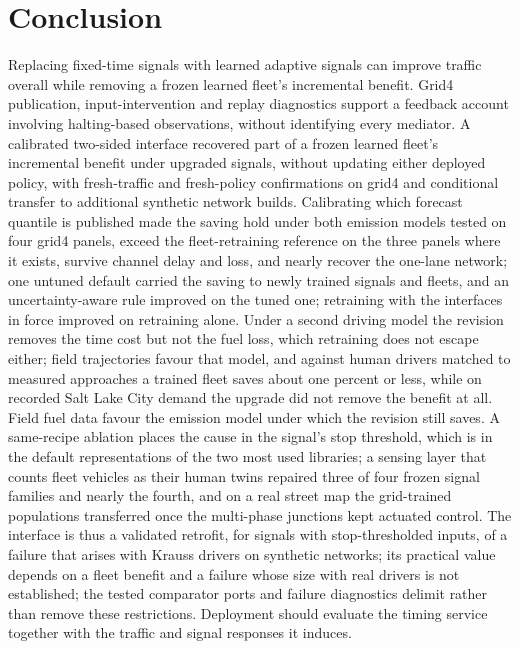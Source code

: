 \section{Conclusion}\label{sec:conclusion}
Replacing fixed-time signals with learned adaptive signals can improve traffic overall while removing a frozen learned fleet's incremental
benefit. Grid4 publication, input-intervention and replay diagnostics support a feedback account involving halting-based observations,
without identifying every mediator. A calibrated two-sided interface recovered part of a frozen learned fleet's incremental benefit under
upgraded signals, without updating either deployed policy, with fresh-traffic and fresh-policy confirmations on grid4 and conditional
transfer to additional synthetic network builds. Calibrating which forecast quantile is published made the saving hold under both
emission models tested on four grid4 panels, exceed the fleet-retraining reference on the three panels where it exists, survive channel
delay and loss, and nearly recover the one-lane network; one untuned default carried the saving to newly trained signals and fleets, and
an uncertainty-aware rule improved on the tuned one; retraining with the interfaces in force improved on retraining alone. Under a second
driving model the revision removes the time cost but not the fuel loss, which retraining does not escape either; field trajectories favour
that model, and against human drivers matched to measured approaches a trained fleet saves about one percent or less, while on recorded Salt
Lake City demand the upgrade did not remove the benefit at all. Field fuel data favour the emission model under which the revision still
saves. A same-recipe ablation places the cause in the signal's stop threshold, which is in the default representations of the two most used
libraries; a sensing layer that counts fleet vehicles as their human twins repaired three of four frozen signal families and nearly the
fourth, and on a real street map the grid-trained populations transferred once the multi-phase junctions kept actuated control. The
interface is thus a validated retrofit, for signals with stop-thresholded inputs, of a failure that arises with Krauss drivers on synthetic networks; its practical value depends
on a fleet benefit and a failure whose size with real drivers is not established; the tested comparator ports and failure
diagnostics delimit rather than remove these restrictions. Deployment should evaluate the timing service together with the
traffic and signal responses it induces.

